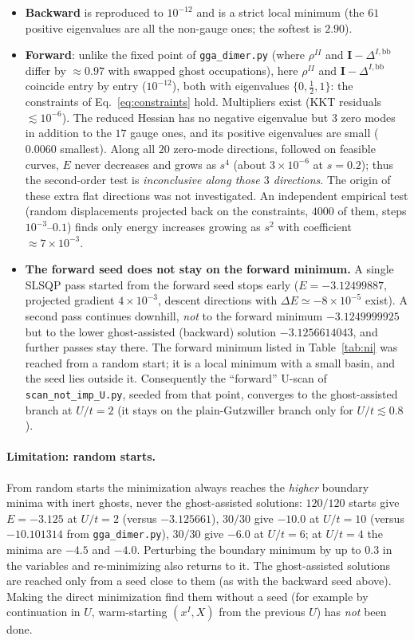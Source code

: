 \documentclass[11pt]{article}
\newcommand{\Ybb}{\Delta^{I,\mathrm{bb}}}
\begin{document}
\begin{itemize}
  \item \textbf{Backward} is reproduced to $10^{-12}$ and is a strict local minimum (the
    $61$ positive eigenvalues are all the non-gauge ones; the softest is $2.90$).
  \item \textbf{Forward}: unlike the fixed point of \texttt{gga\_dimer.py} (where
    $\rho^{II}$ and $\mathbf I-\Ybb$ differ by $\approx0.97$ with swapped ghost occupations),
    here $\rho^{II}$ and $\mathbf I-\Ybb$ coincide entry by entry ($10^{-12}$), both with
    eigenvalues $\{0,\tfrac12,1\}$: the constraints of Eq.~\eqref{eq:constraints} hold. Multipliers
    exist (KKT residuals $\lesssim10^{-6}$). The reduced Hessian has no negative eigenvalue but
    $3$ zero modes in addition to the $17$ gauge ones, and its positive eigenvalues are
    small ($0.0060$ smallest). Along all $20$ zero-mode directions, followed on feasible
    curves, $E$ never decreases and grows as $s^4$ (about $3\times10^{-6}$ at $s=0.2$); thus
    the second-order test is \emph{inconclusive along those $3$ directions}. The origin of
    these extra flat directions was not investigated. An independent empirical test (random
    displacements projected back on the constraints, $4000$ of them, steps $10^{-3}$--$0.1$)
    finds only energy increases growing as $s^2$ with coefficient $\approx7\times10^{-3}$.
  \item \textbf{The forward seed does not stay on the forward minimum.} A single SLSQP pass
    started from the forward seed stops early ($E=-3.12499887$, projected gradient
    $4\times10^{-3}$, descent directions with $\Delta E\simeq-8\times10^{-5}$ exist). A second
    pass continues downhill, \emph{not} to the forward minimum $-3.1249999925$ but to the lower
    ghost-assisted (backward) solution $-3.1256614043$, and further passes stay there. The forward
    minimum listed in Table~\ref{tab:ni} was reached from a random start; it is a local minimum with
    a small basin, and the seed lies outside it. Consequently the ``forward'' U-scan of
    \texttt{scan\_not\_imp\_U.py}, seeded from that point, converges to the ghost-assisted branch
    at $U/t=2$ (it stays on the plain-Gutzwiller branch only for $U/t\lesssim0.8$).
\end{itemize}

\paragraph{Limitation: random starts.} From random starts the minimization always reaches the
\emph{higher} boundary minima with inert ghosts, never the ghost-assisted solutions:
$120/120$ starts give $E=-3.125$ at $U/t=2$ (versus $-3.125661$), $30/30$ give $-10.0$ at
$U/t=10$ (versus $-10.101314$ from \texttt{gga\_dimer.py}), $30/30$ give $-6.0$ at $U/t=6$;
at $U/t=4$ the minima are $-4.5$ and $-4.0$. Perturbing the boundary minimum by up to $0.3$
in the variables and re-minimizing also returns to it. The ghost-assisted solutions are
reached only from a seed close to them (as with the backward seed above). Making the direct
minimization find them without a seed (for example by continuation in $U$, warm-starting
$(x^I,X)$ from the previous $U$) has \emph{not} been done.
\end{document}

